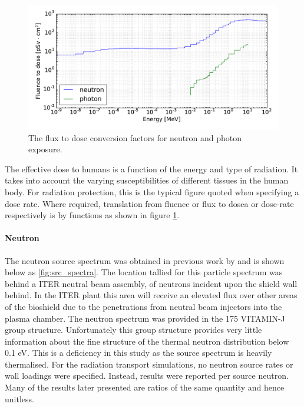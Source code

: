 \begin{figure}[H]
  \includegraphics[width=\textwidth]{icrp74}
  \caption[ICRP74 flux to dose conversion factors.]{The flux to dose conversion factors for neutron and photon exposure.}
  \label{fig:icrp74}
\end{figure}

The effective dose to humans is a function of the energy and type of radiation. It takes into account the varying susceptibilities of different tissues in the human body. For radiation protection, this is the typical figure quoted when specifying a dose rate. Where required, translation from fluence or flux to dosea or dose-rate respectively is by functions as shown in figure \ref{fig:icrp74}.

\paragraph{Neutron}
The neutron source spectrum was obtained in previous work by \citeauthor{Jakhar16} and is shown below as \ref{fig:src_spectra}. The location tallied for this particle spectrum was behind a ITER neutral beam assembly, of neutrons incident upon the shield wall behind. In the ITER plant this area will receive an elevated flux over other areas of the bioshield due to the penetrations from neutral beam injectors into the plasma chamber. The neutron spectrum was provided in the 175 VITAMIN-J group structure. Unfortunately this group structure provides very little information about the fine structure of the thermal neutron distribution below 0.1 eV. This is a deficiency in this study as the source spectrum is heavily thermalised. For the radiation transport simulations, no neutron source rates or wall loadings were specified. Instead, results were reported per source neutron. Many of the results later presented are ratios of the same quantity and hence unitless. 

